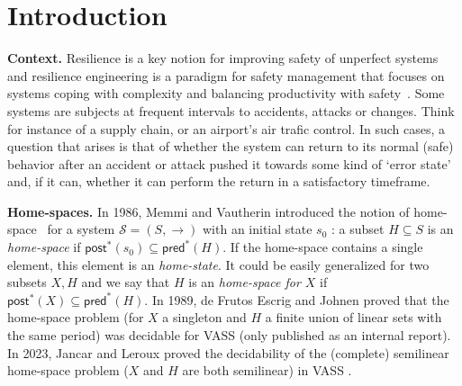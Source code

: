 \documentclass[runningheads]{llncs}
\newcommand{\pred}{\textsf{pred}}
\newcommand{\post}{\textsf{post}}
\begin{document}



\newcommand{\LCM}{\mathsf{LCM}}
\newcommand{\LOGSPACE}{\mathsf{LOGSPACE}}
\newcommand{\MSO}{\mathsf{MSO}}
\newcommand{\SO}{\mathsf{SO}}

 \newcommand{\N}{\mathds{N}}



\section{Introduction}\label{section introduction}


{\bf Context.} 
Resilience is a key notion for improving safety of unperfect systems and resilience engineering is a paradigm for safety management that focuses on systems coping with complexity and balancing productivity with safety~\cite{challenges}. Some systems are subjects at frequent intervals to accidents, attacks or changes. Think for instance of a supply chain, or an airport’s air trafic control. In such cases, a question that arises is that of whether the system can return to its normal (safe) behavior after an accident or attack
pushed it towards some kind of ‘error state’ and, if it can, whether it can perform the return in a satisfactory timeframe. 


{\bf Home-spaces.}
 In 1986, Memmi and Vautherin introduced the notion of home-space~\cite{DBLP:conf/ac/MemmiV86} for a system $\mathscr{S} = (S,\rightarrow )$ with an initial state $s_0$ : a subset $H \subseteq S$ is an \emph{home-space}  if 
$\post^*(s_0) \subseteq \pred^*(H)$. If the home-space contains a single element, this element is an {\em home-state}.
It could be easily generalized for two subsets $X,H$ and we say that $H$ is an \emph{home-space for $X$} if $\post^*(X) \subseteq \pred^*(H)$. In 1989, de Frutos Escrig and Johnen proved that the home-space problem (for $X$ a singleton and $H$ a finite union of linear sets with the same period) was decidable for VASS (only published as an internal report). In 2023, Jancar and Leroux proved the decidability of the (complete) semilinear home-space problem ($X$ and $H$ are both semilinear)  in VASS \cite{DBLP:journals/corr/abs-2207-02697}.
\end{document}
